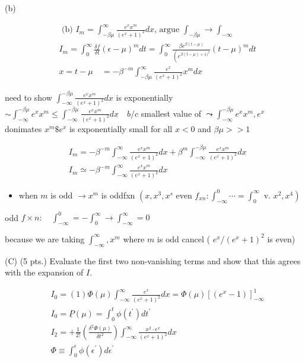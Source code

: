 \documentclass[10pt]{article}
\begin{document}
(b)

$$
\begin{aligned}
& \text { (b) } I_{m}=\int_{-\beta \mu}^{\infty} \frac{e^{x} x^{m}}{\left(e^{x}+1\right)^{2}} d x \text {, argue } \int_{-\beta \mu} \rightarrow \int_{-\infty} \\
& I_{m}=\int_{0}^{\infty} \frac{\delta f}{\delta t}(\epsilon-\mu)^{m} d t=\int_{0}^{\infty} \frac{\beta e^{\beta(t-\mu)}}{\left(e^{\beta(t-\mu)+1)^{2}}\right.}(t-\mu)^{m} d t \\
& x=t-\mu \quad=-\beta^{-m} \int_{-\beta \mu}^{\infty} \frac{e^{x}}{\left(e^{x}+1\right)^{2}} x^{m} d x
\end{aligned}
$$

need to show $\int_{-\infty}^{-\beta \mu} \frac{e^{x} x^{m}}{\left(e^{x}+1\right)^{2}} d x$ is exponentially $\sim \int_{-\infty}^{-\beta \mu} e^{x} x^{m} \leq \int_{-\infty}^{-\beta \mu} \frac{e^{x} x^{m}}{\left(e^{x}+1\right)^{2}} d x \quad b / c$ smallest value of $\leadsto \int_{-\infty}^{-\beta \mu} e^{x} x^{m}, e^{x}$ donimates $x^{m} \$ e^{x}$ is exponentially small for all $x<0$ and $\beta \mu>>1$

$$
\begin{aligned}
& I_{m}=-\beta^{-m} \int_{-\infty}^{\infty} \frac{e^{x} x^{m}}{\left(e^{x}+1\right)^{2}} d x+\beta^{m} \int_{-\infty}^{-\beta \mu} \frac{e^{x} x^{m}}{\left(e^{x}+1\right)^{2}} d x \\
& I_{m} \simeq-\beta^{-m} \int_{-\infty}^{\infty} \frac{e^{x} x^{m}}{\left(e^{x}+1\right)^{2}} d x
\end{aligned}
$$

\begin{itemize}
  \item when $m$ is odd $\rightarrow x^{m}$ is oddfxn $\left(x, x^{3}, x^{s}\right.$ even $f_{x n}: \int_{-\infty}^{0} \cdots=\int_{0}^{\infty}$ v. $\left.x^{2}, x^{4}\right)$
\end{itemize}

odd $f \times n: \quad \int_{-\infty}^{0}=-\int_{0}^{\infty} \rightarrow \int_{-\infty}^{\infty}=0$

because we are taking $\int_{-\infty}^{\infty}, x^{m}$ where $m$ is odd cancel ( $e^{x} /\left(e^{x}+1\right)^{2}$ is even)

(C) (5 pts.) Evaluate the first two non-vanishing terms and show that this agrees with the
expansion of $I$.

$$
\begin{aligned}
& I_{0}=(1) \Phi(\mu) \int_{-\infty}^{\infty} \frac{e^{x}}{\left(e^{x}+1\right)^{2}} d x=\Phi(\mu)\left[\left(e^{x}-1\right)\right]_{-\infty}^{1} \\
& I_{0}=\underline{P}(\mu)=\int_{0}^{t} \phi\left(t^{\prime}\right) d t^{\prime} \\
& I_{2}=+\frac{1}{2 !}\left(\frac{\delta^{2} \Phi(\mu)}{\delta t^{2}}\right) \int_{-\infty}^{\infty} \frac{x^{2} \cdot e^{x}}{\left(e^{x}+1\right)^{2}} d x \\
& \Phi \equiv \int_{0}^{\epsilon} \phi\left(\epsilon^{\prime}\right) d \epsilon^{\prime}
\end{aligned}
$$
\end{document}
